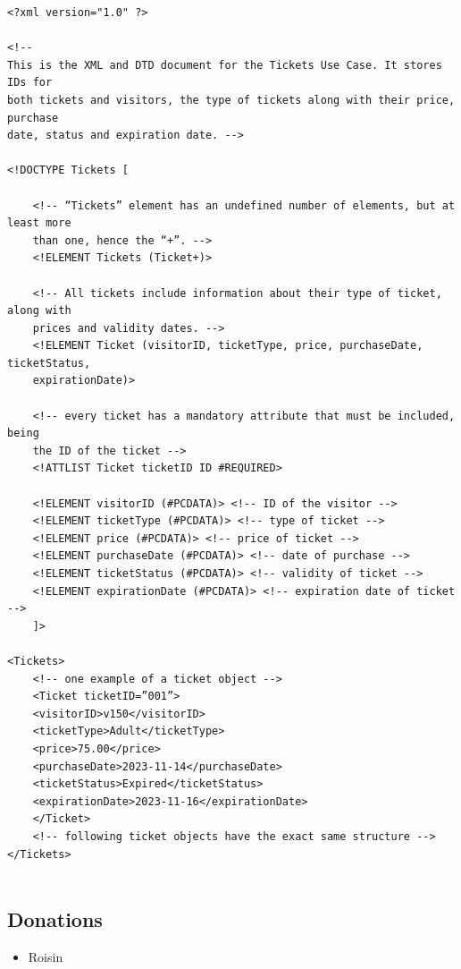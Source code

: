 \documentclass{article} %
\begin{document}
\begin{verbatim}
<?xml version="1.0" ?>

<!-- 
This is the XML and DTD document for the Tickets Use Case. It stores IDs for 
both tickets and visitors, the type of tickets along with their price, purchase 
date, status and expiration date. -->

<!DOCTYPE Tickets [
    
    <!-- “Tickets” element has an undefined number of elements, but at least more  
    than one, hence the “+”. -->
    <!ELEMENT Tickets (Ticket+)>

    <!-- All tickets include information about their type of ticket, along with 
    prices and validity dates. --> 
    <!ELEMENT Ticket (visitorID, ticketType, price, purchaseDate, ticketStatus, 
    expirationDate)>

    <!-- every ticket has a mandatory attribute that must be included, being 
    the ID of the ticket -->
    <!ATTLIST Ticket ticketID ID #REQUIRED>

    <!ELEMENT visitorID (#PCDATA)> <!-- ID of the visitor -->
    <!ELEMENT ticketType (#PCDATA)> <!-- type of ticket -->
    <!ELEMENT price (#PCDATA)> <!-- price of ticket -->
    <!ELEMENT purchaseDate (#PCDATA)> <!-- date of purchase -->
    <!ELEMENT ticketStatus (#PCDATA)> <!-- validity of ticket -->
    <!ELEMENT expirationDate (#PCDATA)> <!-- expiration date of ticket -->
    ]>

<Tickets>
    <!-- one example of a ticket object -->
    <Ticket ticketID=”001”>
    <visitorID>v150</visitorID>
    <ticketType>Adult</ticketType>
    <price>75.00</price>
    <purchaseDate>2023-11-14</purchaseDate>
    <ticketStatus>Expired</ticketStatus>
    <expirationDate>2023-11-16</expirationDate>
    </Ticket>
    <!-- following ticket objects have the exact same structure -->
</Tickets>
    
\end{verbatim}

\subsection{Donations}
\begin{itemize}
    \item Roisin
\end{itemize}
\end{document}
